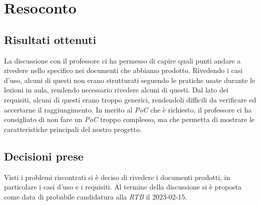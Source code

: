 \section{Resoconto}

\subsection{Risultati ottenuti}
La discussione con il professore ci ha permesso di capire quali punti andare a rivedere nello specifico nei documenti che abbiamo prodotto. Rivedendo i casi d'uso, alcuni di questi non erano strutturati seguendo le pratiche usate durante le lezioni in aula, rendendo necessario rivedere alcuni di questi. Dal lato dei requisiti, alcuni di questi erano troppo generici, rendendoli difficili da verificare ed accertarne il raggiungimento. In merito al \textit{PoC} che è richiesto, il professore ci ha consigliato di non fare un \textit{PoC} troppo complesso, ma che permetta di mostrare le caratteristiche principali del nostro progetto.

\subsection{Decisioni prese}
Visti i problemi riscontrati si è deciso di rivedere i documenti prodotti, in particolare i casi d'uso e i requisiti. Al termine della discussione si è proposta come data di probabile candidatura alla \textit{RTB} il 2023-02-15.